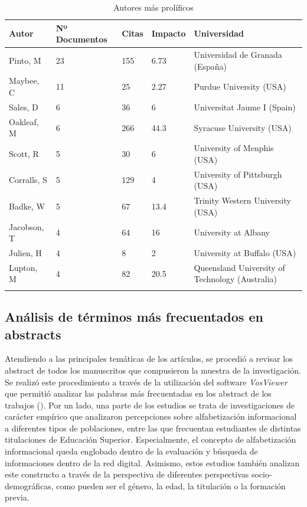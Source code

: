 \documentclass[spanish]{textolivre}
\begin{document}
\begin{table}[h]
\caption{Autores más prolíficos}
\label{tab4}
\centering
\scriptsize
\begin{tabular}{%
    p{}%
    p{}%
    p{}%
    p{}%
    >{\raggedright\arraybackslash}p{}}
\toprule 
Autor & Nº Documentos & Citas & Impacto & Universidad
\\
\midrule
\arrayrulecolor[gray]{.7}
Pinto, M & 23 & 155 & 6.73 & Universidad de Granada (España)
\\
Maybee, C &	11 & 25 & 2.27 & Purdue University (USA)
\\
Sales, D & 6 & 36 & 6 & Universitat Jaume I (Spain)
\\
Oakleaf, M & 6 & 266 & 44.3 & Syracuse University (USA)
\\
Scott, R & 5 & 30 & 6 & University of Menphis (USA)
\\
Corralls, S & 5 & 129 & 4 & University of Pittsburgh (USA)
\\
Badke, W & 5 & 67 & 13.4 & Trinity Western University (USA)
\\
Jacobson, T & 4 & 64 & 16 & University at Albany
\\
Julien, H & 4 & 8 & 2 & University at Buffalo (USA)
\\
Lupton, M & 4 & 82 & 20.5 & Queensland University of Technology (Australia)
\\
\arrayrulecolor{black}
\bottomrule
\end{tabular}
\centering
{}
\end{table}



\subsection{Análisis de términos más frecuentados en abstracts}
Atendiendo a las principales temáticas de los artículos, se procedió a revisar los abstract de todos los manuscritos que compusieron la muestra de la investigación. Se realizó este procedimiento a través de la utilización del software \emph{VosViewer} que permitió analizar las palabras más frecuentadas en los abstract de los trabajos (). Por un lado, una parte de los estudios se trata de investigaciones de carácter empírico que analizaron percepciones sobre alfabetización informacional a diferentes tipos de poblaciones, entre las que frecuentan estudiantes de distintas titulaciones de Educación Superior. Especialmente, el concepto de alfabetización informacional queda englobado dentro de la evaluación y búsqueda de informaciones dentro de la red digital. Asimismo, estos estudios también analizan este constructo a través de la perspectiva de diferentes perspectivas socio-demográficas, como pueden ser el género, la edad, la titulación o la formación previa.
\end{document}

